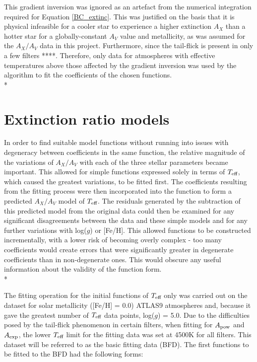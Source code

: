 \documentclass[12pt, a4paper]{report}
\begin{document}
This gradient inversion was ignored as an artefact from the numerical integration required for Equation \ref{BC_extinc}. This was justified on the basis that it is physical infeasible for a cooler star to experience a higher extinction $A_{X}$ than a hotter star for a globally-constant $A_{V}$ value and metallicity, as was assumed for the $A_{X}/A_{V}$ data in this project. Furthermore, since the tail-flick is present in only a few filters ****. Therefore, only data for atmospheres with effective temperatures above those affected by the gradient inversion was used by the algorithm to fit the coefficients of the chosen functions.\\*

\section{Extinction ratio models} \label{ext_models}

In order to find suitable model functions without running into issues with degeneracy between coefficients in the same function, the relative magnitude of the variations of $A_{X}/A_{V}$ with each of the three stellar parameters became important. This allowed for simple functions expressed solely in terms of $T_{\textnormal{eff}}$, which caused the greatest variations, to be fitted first. The coefficients resulting from the fitting process were then incorporated into the function to form a predicted $A_{X}/A_{V}$ model of $T_{\textnormal{eff}}$. The residuals generated by the subtraction of this predicted model from the original data could then be examined for any significant disagreements between the data and these simple models and for any further variations with log($g$) or [Fe/H]. This allowed functions to be constructed incrementally, with a lower risk of becoming overly complex - too many coefficients would create errors that were significantly greater in degenerate coefficients than in non-degenerate ones. This would obscure any useful information about the validity of the function form. \\*

The fitting operation for the initial functions of $T_{\textnormal{eff}}$ only was carried out on the dataset for solar metallicity ([Fe/H] = 0.0) ATLAS9 atmospheres and, because it gave the greatest number of $T_{\textnormal{eff}}$ data points, log($g$) = 5.0. Due to the difficulties posed by the tail-flick phenomenon in certain filters, when fitting for $A_{\textnormal{pow}}$ and $A_{\textnormal{exp}}$, the lower $T_{\textnormal{eff}}$ limit for the fitting data was set at 4500K for all filters. This dataset will be referred to as the basic fitting data (BFD). The first functions to be fitted to the BFD had the following forms:
\end{document}
